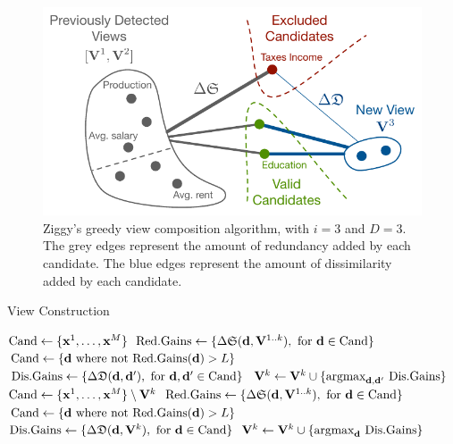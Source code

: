 \begin{figure}
  \centering
  \includegraphics[width=0.85\columnwidth]{Figures/Greedy}
  \caption{Ziggy's greedy view composition algorithm, with
  $i=3$ and $D=3$. The grey edges represent the
  amount of redundancy added by each candidate. The blue edges represent the
  amount of dissimilarity added by each candidate.}
  \label{pic:greedy}
\end{figure}
\begin{algorithm}[t!]
\caption{View Construction}
\label{algo:view_search}
\begin{algorithmic}
        \State $\text{Cand} \gets \{\mathbf{x}^1, \ldots, \mathbf{x}^M\}$
        \State $\text{Red.Gains} \gets 
            \{\Delta\mathfrak{S}(\mathbf{d}, \mathbf{V}^{1..k}), \text{~for~} \mathbf{d} \in \text{Cand}\}$
         \State $\text{Cand} \gets 
            \{\mathbf{d} \text{~where~not~Red.Gains}(\mathbf{d}) > L \}$
        \State $\text{Dis.Gains} \gets 
        \{\Delta\mathfrak{D}(\mathbf{d}, \mathbf{d}'), \text{~for~} \mathbf{d},\mathbf{d}' \in \text{Cand}\}$
        \State $\mathbf{V}^k \gets \mathbf{V}^k \cup \{\text{argmax}_{\bf{d}, \bf{d}'}\ \text{Dis.Gains}\}$
            \State $\text{Cand} \gets \{\mathbf{x}^1, \ldots, \mathbf{x}^M\}
                \setminus \mathbf{V}^k$
            \State $\text{Red.Gains} \gets 
                \{\Delta\mathfrak{S}(\mathbf{d}, \mathbf{V}^{1..k}), \text{~for~} \mathbf{d} \in \text{Cand}\}$
             \State $\text{Cand} \gets 
                \{\mathbf{d} \text{~where~not~Red.Gains}(\mathbf{d}) > L \}$
            \State $\text{Dis.Gains} \gets 
                \{\Delta\mathfrak{D}(\mathbf{d}, \mathbf{V}^{k}), \text{~for~} \mathbf{d} \in \text{Cand}\}$
            \State $\mathbf{V}^k \gets \mathbf{V}^k \cup \{\text{argmax}_{\bf{d}}\ \text{Dis.Gains}\}$
        \EndFor
    \EndFor
    \EndFunction
\end{algorithmic}
\end{algorithm}

